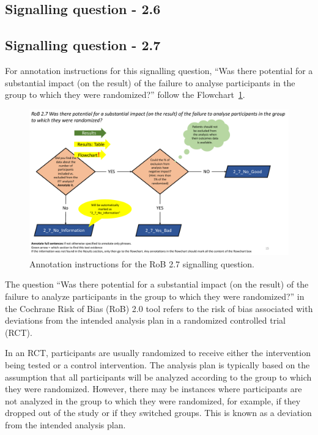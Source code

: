 \documentclass[sn-mathphys,Numbered]{sn-jnl}%
\begin{document}
\subsection*{Signalling question - 2.6 }
%

%
%
%
\subsection*{Signalling question - 2.7 }
%
For annotation instructions for this signalling question, ``Was there potential for a substantial impact (on the result) of the failure to analyse participants in the group to which they were randomized?'' follow the Flowchart~\ref{fig:2_7}.
%
\begin{figure}[hbt]
    \centering
    \includegraphics[width=\textwidth]{figures/2_7.pdf}
    \caption{Annotation instructions for the RoB 2.7 signalling question.}
    \label{fig:2_7}
\end{figure}


The question ``Was there potential for a substantial impact (on the result) of the failure to analyze participants in the group to which they were randomized?'' in the Cochrane Risk of Bias (RoB) 2.0 tool refers to the risk of bias associated with deviations from the intended analysis plan in a randomized controlled trial (RCT).

In an RCT, participants are usually randomized to receive either the intervention being tested or a control intervention. The analysis plan is typically based on the assumption that all participants will be analyzed according to the group to which they were randomized. However, there may be instances where participants are not analyzed in the group to which they were randomized, for example, if they dropped out of the study or if they switched groups. This is known as a deviation from the intended analysis plan.
\end{document}
